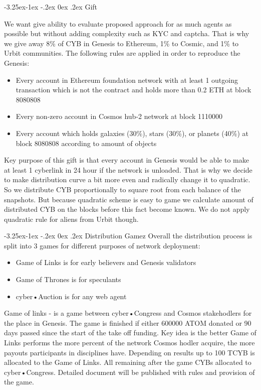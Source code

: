 \documentclass[8pt,oneside]{amsart}
\makeatletter
\renewcommand\subsection{\@startsection{subsection}{2}{\z@}%
                                     {-3.25ex\@plus -1ex \@minus -.2ex}%
                                     {0ex \@plus .2ex}%
                                     {\play\Large}}%
\newcommand{\titleSection}[1]{\subsection{#1}}
\makeatother
\begin{document}
\begin{Abstract}
\titleSection{Gift}\label{gift}

We want give ability to evaluate proposed approach for as much agents as possible but without adding complexity such as KYC and captcha. That is why we give away 8\% of CYB in Genesis to Ethereum, 1\% to Cosmic, and 1\% to Urbit communities. The following rules are applied in order to reproduce the Genesis:
\begin{itemize}
\item Every account in Ethereum foundation network with at least 1 outgoing transaction which is not the contract and holds more than 0.2 ETH at block 8080808
\item Every non-zero account in Cosmos hub-2 network at block 1110000
\item Every account which holds galaxies (30\%), stars (30\%), or planets (40\%) at block 8080808 according to amount of objects
\end{itemize}

Key purpose of this gift is that every account in Genesis would be able to make at least 1 cyberlink in 24 hour if the network is unloaded. That is why we decide to make distribution curve a bit more even and radically change it to quadratic. So we distribute CYB proportionally to square root from each balance of the snapshots. But because quadratic scheme is easy to game we calculate amount of distributed CYB on the blocks before this fact become known. We do not apply quadratic rule for aliens from Urbit though.

\titleSection{Distribution Gamez}\label{gamez}
Overall the distribution process is split into 3 games for different purposes of network deployment:
\begin{itemize}
\item Game of Links is for early believers and Genesis validators
\item Game of Thrones is for speculants
\item cyber•Auction is for any web agent
\end{itemize}

Game of links - is a game between cyber•Congress and Cosmos stakehodlers for the place in Genesis. The game is finished if either 600000 ATOM donated or 90 days passed since the start of the take off funding. Key idea is the better Game of Links performs the more percent of the network Cosmos hodler acquire, the more payouts participants in disciplines have. Depending on results up to 100 TCYB is allocated to the Game of Links. All remaining after the game CYBs allocated to cyber•Congress. Detailed document will be published with rules and provision of the game.


\end{Abstract}
\end{document}
